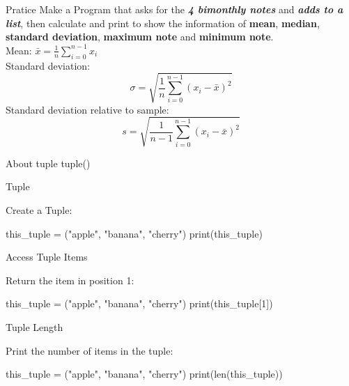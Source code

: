 \documentclass[hyperref={pdfpagelabels=false}]{beamer}
\begin{document}
\begin{frame}[fragile] \begin{block}{Pratice}
Make a Program that asks for the \textbf{\textit{4 bimonthly notes}} and
\textbf{\textit{adds to a list}}, then calculate and print to show the
information of \textbf{mean}, \textbf{median}, \textbf{standard deviation},
\textbf{maximum note} and \textbf{minimum note}.\\[5mm]

Mean: $ \bar{x} = \frac{1}{n}\sum_{i=0}^{n-1} x_{i} $\\[5mm]

Standard deviation: $$ \sigma = \sqrt{\frac{1}{n}\sum_{i=0}^{n-1}(x_{i} - \bar{x})^{2}} $$
Standard deviation relative to sample: $$ s = \sqrt{\frac{1}{n-1}\sum_{i=0}^{n-1}(x_{i} - \bar{x})^{2}} $$
\end{block}

\end{frame}

\begin{frame}{About tuple}
\centering
\Huge{tuple()}
\end{frame}

\begin{frame}[fragile]{Tuple}
\begin{exampleblock}{Create a Tuple:}
\begin{python3}
this_tuple = ("apple", "banana", "cherry")
print(this_tuple)
\end{python3}
\end{exampleblock}
\end{frame}

\begin{frame}[fragile]{Access Tuple Items}
\begin{exampleblock}{Return the item in position 1:}
\begin{python3}
this_tuple = ("apple", "banana", "cherry")
print(this_tuple[1])
\end{python3}
\end{exampleblock}
\end{frame}

\begin{frame}[fragile]{Tuple Length}
\begin{exampleblock}{Print the number of items in the tuple:}
\begin{python3}
this_tuple = ("apple", "banana", "cherry")
print(len(this_tuple))
\end{python3}
\end{exampleblock}
\end{frame}
\end{document}
